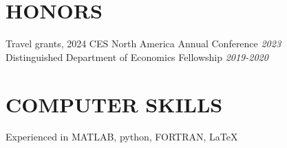\documentclass[10pt]{res} %
\begin{document}
\begin{resume}
\section{HONORS}
Travel grants, 2024 CES North America Annual Conference \hfill \textit{2023} \\
Distinguished Department of Economics Fellowship \hfill  \textit{2019-2020} \\

\vspace{-10pt}

\section{COMPUTER SKILLS}

Experienced in MATLAB, python, FORTRAN, \LaTeX{}

\end{resume}
\end{document}
